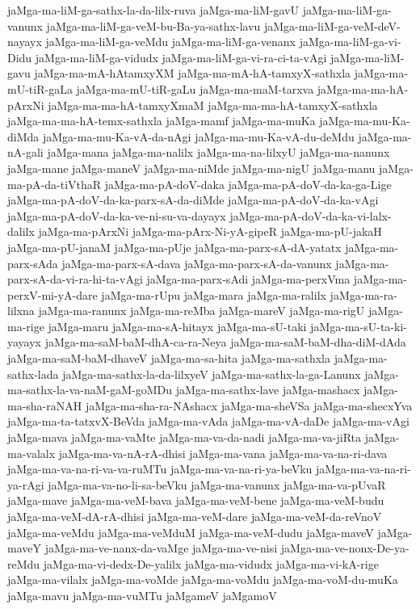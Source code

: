 {jaMga-ma-liM-ga-sathx-la-da-lilx-ruva
jaMga-ma-liM-gavU
jaMga-ma-liM-ga-vanunx
jaMga-ma-liM-ga-veM-bu-Ba-ya-sathx-lavu
jaMga-ma-liM-ga-veM-deV-nayayx
jaMga-ma-liM-ga-veMdu
jaMga-ma-liM-ga-venanx
jaMga-ma-liM-ga-vi-Didu
jaMga-ma-liM-ga-vidudx
jaMga-ma-liM-ga-vi-ra-ci-ta-vAgi
jaMga-ma-liM-gavu
jaMga-ma-mA-hAtamxyXM
jaMga-ma-mA-hA-tamxyX-sathxla
jaMga-ma-mU-tiR-gaLa
jaMga-ma-mU-tiR-gaLu
jaMga-ma-maM-tarxva
jaMga-ma-ma-hA-pArxNi
jaMga-ma-ma-hA-tamxyXmaM
jaMga-ma-ma-hA-tamxyX-sathxla
jaMga-ma-ma-hA-temx-sathxla
jaMga-mamf
jaMga-ma-muKa
jaMga-ma-mu-Ka-diMda
jaMga-ma-mu-Ka-vA-da-nAgi
jaMga-ma-mu-Ka-vA-du-deMdu
jaMga-ma-nA-gali
jaMga-mana
jaMga-ma-nalilx
jaMga-ma-na-lilxyU
jaMga-ma-nanunx
jaMga-mane
jaMga-maneV
jaMga-ma-niMde
jaMga-ma-nigU
jaMga-manu
jaMga-ma-pA-da-tiVthaR
jaMga-ma-pA-doV-daka
jaMga-ma-pA-doV-da-ka-ga-Lige
jaMga-ma-pA-doV-da-ka-parx-sA-da-diMde
jaMga-ma-pA-doV-da-ka-vAgi
jaMga-ma-pA-doV-da-ka-ve-ni-su-va-dayayx
jaMga-ma-pA-doV-da-ka-vi-lalx-dalilx
jaMga-ma-pArxNi
jaMga-ma-pArx-Ni-yA-gipeR
jaMga-ma-pU-jakaH
jaMga-ma-pU-janaM
jaMga-ma-pUje
jaMga-ma-parx-sA-dA-yatatx
jaMga-ma-parx-sAda
jaMga-ma-parx-sA-dava
jaMga-ma-parx-sA-da-vanunx
jaMga-ma-parx-sA-da-vi-ra-hi-ta-vAgi
jaMga-ma-parx-sAdi
jaMga-ma-perxVma
jaMga-ma-perxV-mi-yA-dare
jaMga-ma-rUpu
jaMga-mara
jaMga-ma-ralilx
jaMga-ma-ra-lilxna
jaMga-ma-ranunx
jaMga-ma-reMba
jaMga-mareV
jaMga-ma-rigU
jaMga-ma-rige
jaMga-maru
jaMga-ma-sA-hitayx
jaMga-ma-sU-taki
jaMga-ma-sU-ta-ki-yayayx
jaMga-ma-saM-baM-dhA-ca-ra-Neya
jaMga-ma-saM-baM-dha-diM-dAda
jaMga-ma-saM-baM-dhaveV
jaMga-ma-sa-hita
jaMga-ma-sathxla
jaMga-ma-sathx-lada
jaMga-ma-sathx-la-da-lilxyeV
jaMga-ma-sathx-la-ga-Lanunx
jaMga-ma-sathx-la-va-naM-gaM-goMDu
jaMga-ma-sathx-lave
jaMga-mashacx
jaMga-ma-sha-raNAH
jaMga-ma-sha-ra-NAshacx
jaMga-ma-sheVSa
jaMga-ma-shecxYva
jaMga-ma-ta-tatxvX-BeVda
jaMga-ma-vAda
jaMga-ma-vA-daDe
jaMga-ma-vAgi
jaMga-mava
jaMga-ma-vaMte
jaMga-ma-va-da-nadi
jaMga-ma-va-jiRta
jaMga-ma-valalx
jaMga-ma-va-nA-rA-dhisi
jaMga-ma-vana
jaMga-ma-va-na-ri-dava
jaMga-ma-va-na-ri-va-va-ruMTu
jaMga-ma-va-na-ri-ya-beVku
jaMga-ma-va-na-ri-ya-rAgi
jaMga-ma-va-no-li-sa-beVku
jaMga-ma-vanunx
jaMga-ma-va-pUvaR
jaMga-mave
jaMga-ma-veM-bava
jaMga-ma-veM-bene
jaMga-ma-veM-budu
jaMga-ma-veM-dA-rA-dhisi
jaMga-ma-veM-dare
jaMga-ma-veM-da-reVnoV
jaMga-ma-veMdu
jaMga-ma-veMduM
jaMga-ma-veM-dudu
jaMga-maveV
jaMga-maveY
jaMga-ma-ve-nanx-da-vaMge
jaMga-ma-ve-nisi
jaMga-ma-ve-nonx-De-ya-reMdu
jaMga-ma-vi-dedx-De-yalilx
jaMga-ma-vidudx
jaMga-ma-vi-kA-rige
jaMga-ma-vilalx
jaMga-ma-voMde
jaMga-ma-voMdu
jaMga-ma-voM-du-muKa
jaMga-mavu
jaMga-ma-vuMTu
jaMgameV
jaMgamoV
}
